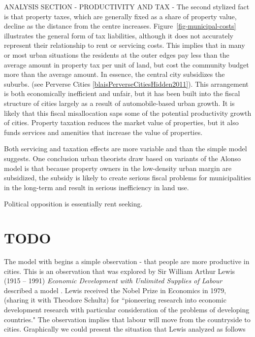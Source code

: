 ANALYSIS SECTION - PRODUCTIVITY AND TAX - The second stylized fact is that property taxes, which are generally  fixed as a share of property value, decline as the distance from the centre increases. Figure~\ref{fig-municipal-costs} illustrates the general form of tax liabilities, although it does not  accurately represent their relationship to rent or  servicing costs. This implies that in many or most urban situations the residents at the outer edges pay less than the average amount in property tax per unit of land, but cost  the community budget more than the average amount. In essence, the central city subsidizes the suburbs. (see Perverse Cities \ref{blaisPerverseCitiesHidden2011}). This arrangement is both economically inefficient and unfair, but it has been built into the fiscal structure of cities largely as a result of automobile-based urban growth. It is likely that this fiscal misallocation saps some of the potential productivity growth of cities. Property taxation reduces the market value of properties, but it also funds services and amenities that increase the value of properties. 

Both servicing and taxation effects are more variable and than the simple model suggests.  One conclusion urban theorists draw based on variants of the Alonso model is that because property owners in the low-density urban margin are subsidized,  the subsidy is likely to create serious fiscal problems for municipalities in the long-term and result in serious inefficiency in land use.

Political opposition is essentially rent seeking.



\chapter{TODO}

The model with begins a simple observation - that people are more productive in cities. This is an observation that was explored by Sir William Arthur Lewis (1915 -- 1991)  \emph{Economic Development with Unlimited Supplies of Labour} described a model 
\cite{Lewis1954EconomicDW}. Lewis received the Nobel Prize in Economics in 1979, (sharing it with Theodore Schultz) for ``pioneering research into economic development research with particular consideration of the problems of developing countries." The observation implies that labour will move from the countryside to cities.  Graphically we could present the situation that Lewis analyzed as follows


